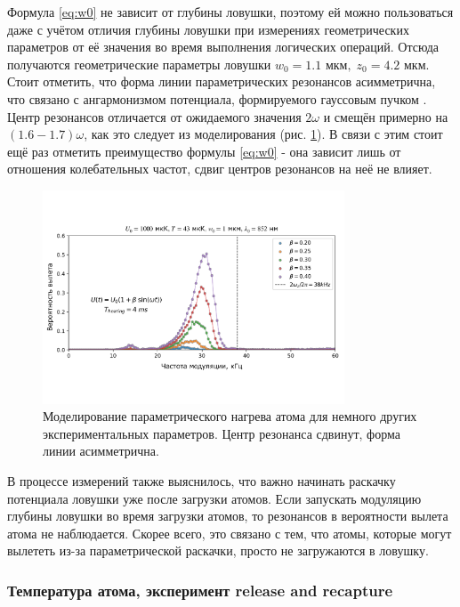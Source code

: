 Формула \ref{eq:w0} не зависит от глубины ловушки, поэтому ей можно пользоваться даже с учётом отличия глубины ловушки при измерениях геометрических параметров от её значения во время выполнения логических операций. Отсюда получаются геометрические параметры ловушки $w_0 = 1.1 \text{ мкм}, \; z_0 = 4.2 \text{ мкм}$. Стоит отметить, что форма линии параметрических резонансов асимметрична, что связано с ангармонизмом потенциала, формируемого гауссовым пучком \cite{Param_Heating_Friebel,J_uregui_2001}. Центр резонансов отличается от ожидаемого значения $2\omega$ и смещён примерно на $(1.6-1.7)\omega$, как это следует из моделирования (рис. \ref{fig:parametric_test}). В связи с этим стоит ещё раз отметить преимущество формулы \ref{eq:w0} - она зависит лишь от отношения колебательных частот, сдвиг центров резонансов на неё не влияет.

\begin{figure}[H]
	\centering
	\includegraphics[width=0.8\textwidth]{images/parametric_test.pdf}
	\caption{Моделирование параметрического нагрева атома для немного других экспериментальных параметров. Центр резонанса сдвинут, форма линии асимметрична.}
	\label{fig:parametric_test}
\end{figure}

В процессе измерений также выяснилось, что важно начинать раскачку потенциала ловушки уже после загрузки атомов. Если запускать модуляцию глубины ловушки во время загрузки атомов, то резонансов в вероятности вылета атома не наблюдается. Скорее всего, это связано с тем, что атомы, которые могут вылететь из-за параметрической раскачки, просто не загружаются в ловушку. 

\subsubsection{Температура атома, эксперимент release and recapture}
\label{sec:atom_temp}

